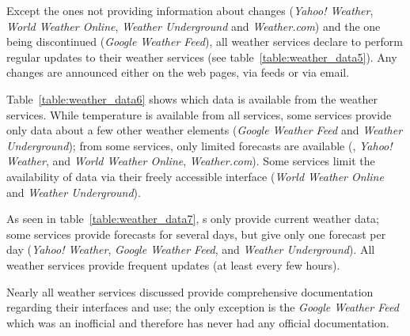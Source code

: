 Except the ones not providing information about changes (\emph{Yahoo! Weather}, \emph{World Weather Online}, \emph{Weather Underground} and \emph{Weather.com}) and the one being discontinued (\emph{Google Weather Feed}), all weather services declare to perform regular updates to their weather services (see table~\ref{table:weather_data5}). Any changes are announced either on the web pages, via  feeds or via email.

Table~\ref{table:weather_data6} shows which data is available from the weather services. While temperature is available from all services, some services provide only data about a few other weather elements (\emph{Google Weather Feed} and \emph{Weather Underground}); from some services, only limited forecasts are available (, \emph{Yahoo! Weather}, and \emph{World Weather Online}, \emph{Weather.com}). Some services limit the availability of data via their freely accessible interface (\emph{World Weather Online} and \emph{Weather Underground}).

As seen in table~\ref{table:weather_data7}, s only provide current weather data; some services provide forecasts for several days, but give only one forecast per day (\emph{Yahoo! Weather}, \emph{Google Weather Feed}, and \emph{Weather Underground}). All weather services provide frequent updates (at least every few hours).

Nearly all weather services discussed provide comprehensive documentation regarding their interfaces and use; the only exception is the \emph{Google Weather Feed} which was an inofficial  and therefore has never had any official documentation.

